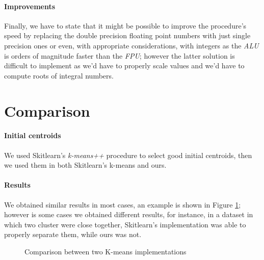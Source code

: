 \documentclass[parskip=full]{report}
\begin{document}
\paragraph{Improvements}
Finally, we have to state that it might be possible to improve the procedure's speed by replacing the double precision floating point numbers with just single precision ones or even, with appropriate considerations, with integers as the \textit{ALU} is orders of magnitude faster than the \textit{FPU}; however the latter solution is difficult to implement as we'd have to properly scale values and we'd have to compute roots of integral numbers.

\section{Comparison}

\paragraph{Initial centroids}
We used Skitlearn's \emph{k-means++} procedure to select good initial centroids, then we used them in both Skitlearn's k-means and ours.

\paragraph{Results}
We obtained similar results in most cases, an example is shown in Figure \ref{fig:clusters}; however is some cases we obtained different results, for instance, in a dataset in which two cluster were close together, Skitlearn's implementation was able to properly separate them, while ours was not.

\begin{figure}[h]
	\centering
	
	\caption{Comparison between two K-means implementations}
	\label{fig:clusters}
\end{figure}
\end{document}
